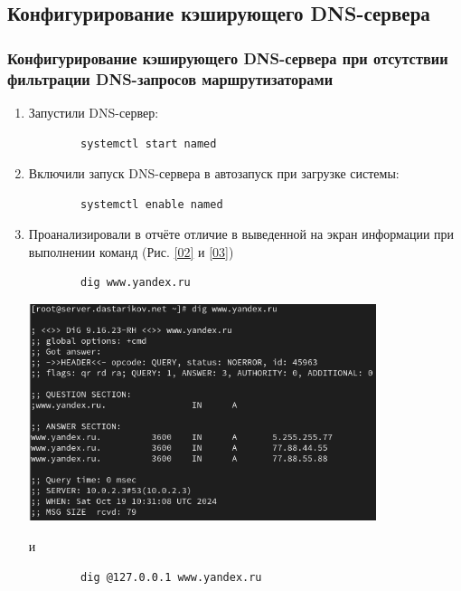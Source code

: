 \subsection{Конфигурирование кэширующего DNS-сервера}
\subsubsection{Конфигурирование кэширующего DNS-сервера при отсутствии фильтрации DNS-запросов маршрутизаторами}
\begin{enumerate}
    \item Запустили DNS-сервер:
        \begin{verbatim}
        systemctl start named
        \end{verbatim}
    \item Включили запуск DNS-сервера в автозапуск при загрузке системы:
        \begin{verbatim}
        systemctl enable named
        \end{verbatim}
    \item Проанализировали в отчёте отличие в выведенной на экран информации при выполнении команд (Рис. \ref{02} и \ref{03})
        \begin{verbatim}
        dig www.yandex.ru
        \end{verbatim}

\begin{center}
    \centering
    \includegraphics[width=0.8\textwidth]{../images/image02.png}
    \label{02}
\end{center}

    и
        \begin{verbatim}
        dig @127.0.0.1 www.yandex.ru
        \end{verbatim}


\end{enumerate}
